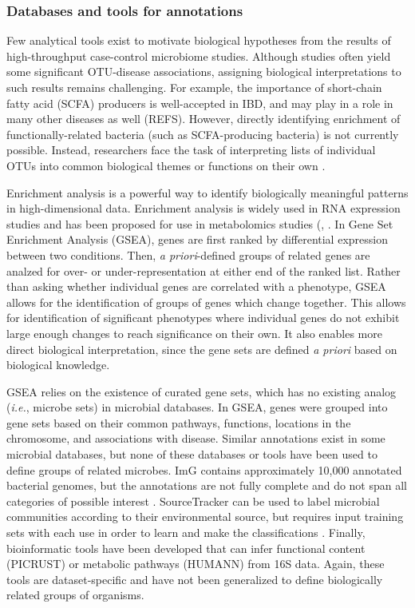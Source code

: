 \documentclass[12pt]{article}
\begin{document}
\subsubsection{Databases and tools for annotations}\label{sec:gsea}
Few analytical tools exist to motivate biological hypotheses from the 
results of high-throughput case-control microbiome studies. Although 
studies often yield some significant OTU-disease associations, 
assigning biological interpretations to such results remains 
challenging. For example, the importance of short-chain fatty acid 
(SCFA) producers is well-accepted in IBD, and may play in a role in 
many other diseases as well (REFS). However, directly identifying 
enrichment of functionally-related bacteria (such as SCFA-producing 
bacteria) is not currently possible. Instead, researchers face the 
task of interpreting lists of individual OTUs into common biological 
themes or functions on their own \cite{subramanian-gsea-2005}. 

Enrichment analysis is a powerful way to identify biologically 
meaningful patterns in high-dimensional data. Enrichment analysis is 
widely used in RNA expression studies and has been proposed for use in 
metabolomics studies (\cite{subramanian-gsea-2005}, 
\cite{xia-msea-2010}. In Gene Set Enrichment Analysis (GSEA), genes are first 
ranked by differential expression between two conditions. Then, 
\textit{a priori}-defined groups of related genes are analzed for 
over- or under-representation at either end of the ranked list. Rather 
than asking whether individual genes are correlated with a phenotype, 
GSEA allows for the identification of groups of genes which change 
together. This allows for identification of significant phenotypes 
where individual genes do not exhibit large enough changes to reach 
significance on their own. It also enables more direct biological 
interpretation, since the gene sets are defined \textit{a priori} 
based on biological knowledge. 

GSEA relies on the existence of curated gene sets, which has no 
existing analog (\textit{i.e.}, microbe sets) in microbial databases. 
In GSEA, genes were grouped into gene sets based on their common 
pathways, functions, locations in the chromosome, and associations 
with disease. Similar annotations exist in some microbial databases, 
but none of these databases or tools have been used to define groups 
of related microbes. ImG contains approximately 10,000 annotated 
bacterial genomes, but the annotations are not fully complete and do 
not span all categories of possible interest \cite{markowitz-img-2013}. SourceTracker 
can be used to label microbial communities according to their 
environmental source, but requires input training sets with each use 
in order to learn and make the classifications \cite{knights-sourcetracker-2011}. 
Finally, bioinformatic tools have been developed that can infer functional 
content (PICRUST) \cite{langille-picrust-2013} or metabolic pathways 
(HUMANN) \cite{abubucker-humann-2012} from 16S data. Again, 
these tools are dataset-specific and have not been generalized to 
define biologically related groups of organisms.
\end{document}
